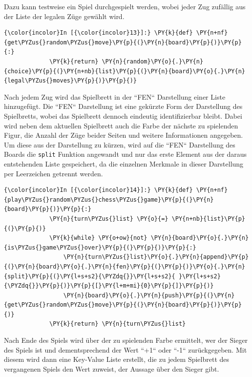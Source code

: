     Dazu kann testweise ein Spiel durchgespielt werden, wobei jeder Zug
zufällig aus der Liste der legalen Züge gewählt wird.

    \begin{Verbatim}[commandchars=\\\{\}]
{\color{incolor}In [{\color{incolor}13}]:} \PY{k}{def} \PY{n+nf}{get\PYZus{}random\PYZus{}move}\PY{p}{(}\PY{n}{board}\PY{p}{)}\PY{p}{:}
             \PY{k}{return} \PY{n}{random}\PY{o}{.}\PY{n}{choice}\PY{p}{(}\PY{n+nb}{list}\PY{p}{(}\PY{n}{board}\PY{o}{.}\PY{n}{legal\PYZus{}moves}\PY{p}{)}\PY{p}{)}
\end{Verbatim}


    Nach jedem Zug wird das Spielbrett in der ``FEN`` Darstellung einer Liste
hinzugefügt. Die ``FEN`` Darstellung ist eine gekürzte Form der
Darstellung des Spielbretts, wobei das Spielbrett dennoch eindeutig
identifizierbar bleibt. Dabei wird neben dem aktuellen Spielbrett auch
die Farbe der nächste zu spielenden Figur, die Anzahl der Züge beider
Seiten und weitere Informationen angegeben. Um diese aus der Darstellung
zu kürzen, wird auf die ``FEN`` Darstellung des Boards die
\texttt{split} Funktion angewandt und nur das erste Element aus der
daraus entstehenden Liste gespeichert, da die einzelnen Merkmale in
dieser Darstellung per Leerzeichen getrennt werden.

    \begin{Verbatim}[commandchars=\\\{\}]
{\color{incolor}In [{\color{incolor}14}]:} \PY{k}{def} \PY{n+nf}{play\PYZus{}random\PYZus{}chess\PYZus{}game}\PY{p}{(}\PY{n}{board}\PY{p}{)}\PY{p}{:}
             \PY{n}{turn\PYZus{}list} \PY{o}{=} \PY{n+nb}{list}\PY{p}{(}\PY{p}{)}
             \PY{k}{while} \PY{o+ow}{not} \PY{n}{board}\PY{o}{.}\PY{n}{is\PYZus{}game\PYZus{}over}\PY{p}{(}\PY{p}{)}\PY{p}{:}
                 \PY{n}{turn\PYZus{}list}\PY{o}{.}\PY{n}{append}\PY{p}{(}\PY{n}{board}\PY{o}{.}\PY{n}{fen}\PY{p}{(}\PY{p}{)}\PY{o}{.}\PY{n}{split}\PY{p}{(}\PY{l+s+s2}{\PYZdq{}}\PY{l+s+s2}{ }\PY{l+s+s2}{\PYZdq{}}\PY{p}{)}\PY{p}{[}\PY{l+m+mi}{0}\PY{p}{]}\PY{p}{)}
                 \PY{n}{board}\PY{o}{.}\PY{n}{push}\PY{p}{(}\PY{n}{get\PYZus{}random\PYZus{}move}\PY{p}{(}\PY{n}{board}\PY{p}{)}\PY{p}{)}
             \PY{k}{return} \PY{n}{turn\PYZus{}list}
\end{Verbatim}


    Nach Ende des Spiels wird über der zu spielenden Farbe ermittelt, wer
der Sieger des Spiels ist und dementsprechend der Wert ``+1`` oder ``-1``
zurückgegeben. Mit diesem wird dann eine Key-Value Liste erstellt, die
zu jedem Spielbrett des vergangenen Spiels den Wert zuweist, der Aussage
über den Sieger gibt.

